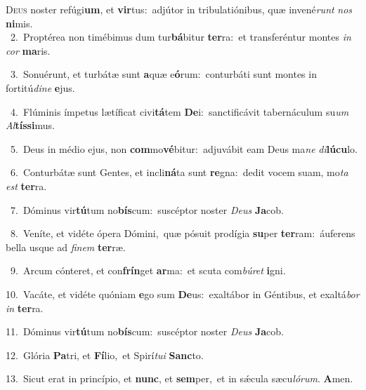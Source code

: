 \lettrine{\initial\textcolor{\initialcolor}{D}}{eus} noster refúgi\-\textbf{um}\-, et \textbf{vir}\-tus:~\star adjútor in tribulatiónibus, quæ invené\textit{runt} \textit{nos} \textbf{ni}\-mis.\\
{\numbfont\textcolor{\numbcolor}{~2.}}~Proptérea non timébimus dum tur\-\textbf{bá}\-bitur \textbf{ter}\-ra:~\star et transferéntur montes \textit{in} \textit{cor} \textbf{ma}\-ris.\par
{\numbfont\textcolor{\numbcolor}{~3.}}~Sonuérunt, et turbátæ sunt \textbf{a}\-quæ e\-\textbf{ó}\-rum:~\star conturbáti sunt montes in fortitú\-\textit{di}\-\textit{ne} \textbf{e}\-jus.\par
{\numbfont\textcolor{\numbcolor}{~4.}}~Flúminis ímpetus lætíficat civi\-\textbf{tá}\-tem \textbf{De}\-i:~\star sanctificávit tabernáculum su\textit{um} \textit{Al}\-\textbf{tís}\textbf{si}mus.\par
{\numbfont\textcolor{\numbcolor}{~5.}}~Deus in médio ejus, non \textbf{com}\-mo\-\textbf{vé}\-bitur:~\star adjuvábit eam Deus ma\textit{ne} \textit{di}\-\textbf{lú}\textbf{cu}lo.\par
{\numbfont\textcolor{\numbcolor}{~6.}}~Conturbátæ sunt Gentes, et incli\-\textbf{ná}\-ta sunt \textbf{re}\-gna:~\star dedit vocem suam, mo\textit{ta} \textit{est} \textbf{ter}\-ra.\par
{\numbfont\textcolor{\numbcolor}{~7.}}~Dóminus vir\-\textbf{tú}\-tum no\-\textbf{bís}\-cum:~\star suscéptor noster \textit{De}\-\textit{us} \textbf{Ja}\-cob.\par
{\numbfont\textcolor{\numbcolor}{~8.}}~Veníte, et vidéte ópera Dómini,~\dagger quæ pósuit prodígia \textbf{su}\-per \textbf{ter}\-ram:~\star áuferens bella usque ad \textit{fi}\-\textit{nem} \textbf{ter}\-ræ.\par
{\numbfont\textcolor{\numbcolor}{~9.}}~Arcum cónteret, et con\-\textbf{frín}\-get \textbf{ar}\-ma:~\star et scuta com\-\textit{bú}\-\textit{ret} \textbf{i}\-gni.\par
{\numbfont\textcolor{\numbcolor}{10.}}~Vacáte, et vidéte quóniam \textbf{e}\-go sum \textbf{De}\-us:~\star exaltábor in Géntibus, et exaltá\textit{bor} \textit{in} \textbf{ter}\-ra.\par
{\numbfont\textcolor{\numbcolor}{11.}}~Dóminus vir\-\textbf{tú}\-tum no\-\textbf{bís}\-cum:~\star suscéptor noster \textit{De}\-\textit{us} \textbf{Ja}\-cob.\par
{\numbfont\textcolor{\numbcolor}{12.}}~Glória \textbf{Pa}\-tri, et \textbf{Fí}\-lio,~\star et Spirí\-\textit{tu}\-\textit{i} \textbf{Sanc}\-to.\par
{\numbfont\textcolor{\numbcolor}{13.}}~Sicut erat in princípio, et \textbf{nunc}\-, et \textbf{sem}\-per,~\star et in sǽcula sæcu\-\textit{ló}\-\textit{rum}. \textbf{A}\-men.\par
